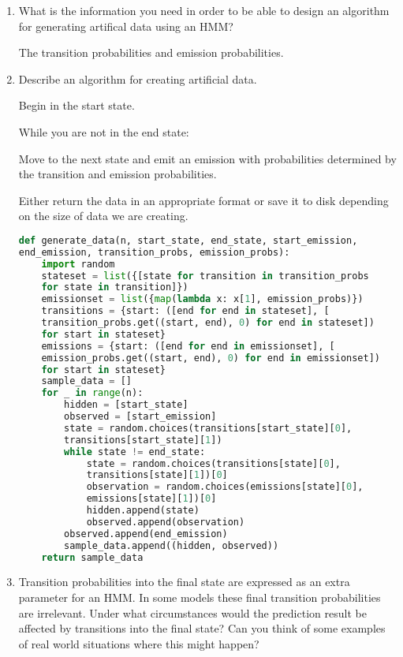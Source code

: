 \documentclass[10pt,\jkfside,a4paper]{article}
\begin{document}
\begin{enumerate}

\item What is the information you need in order to be able to design an algorithm
for generating artifical data using an HMM?

The transition probabilities and emission probabilities.

\item Describe an algorithm for creating artificial data.

Begin in the start state. 

While you are not in the end state:

Move to the next state and emit an emission with probabilities determined by the 
transition and emission probabilities.

Either return the data in an appropriate format or save it to disk depending on the 
size of data we are creating.

\begin{lstlisting}[language=python]
def generate_data(n, start_state, end_state, start_emission, 
end_emission, transition_probs, emission_probs):
    import random
    stateset = list({[state for transition in transition_probs 
	for state in transition]})
    emissionset = list({map(lambda x: x[1], emission_probs)})
    transitions = {start: ([end for end in stateset], [
	transition_probs.get((start, end), 0) for end in stateset]) 
	for start in stateset}
    emissions = {start: ([end for end in emissionset], [
	emission_probs.get((start, end), 0) for end in emissionset]) 
	for start in stateset}
    sample_data = []
    for _ in range(n):
        hidden = [start_state]
        observed = [start_emission]
        state = random.choices(transitions[start_state][0], 
		transitions[start_state][1])
        while state != end_state:
            state = random.choices(transitions[state][0], 
			transitions[state][1])[0]
            observation = random.choices(emissions[state][0], 
			emissions[state][1])[0]
            hidden.append(state)
            observed.append(observation)
        observed.append(end_emission)
        sample_data.append((hidden, observed))
    return sample_data
\end{lstlisting}

\item Transition probabilities into the final state are expressed as an extra
parameter for an HMM. In some models these final transition probabilities
are irrelevant. Under what circumstances would the prediction result be
affected by transitions into the final state? Can you think of some examples
of real world situations where this might happen?


\end{enumerate}
\end{document}
